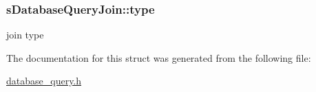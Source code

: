 \subsubsection[{\texorpdfstring{type}{type}}]{ s\+Database\+Query\+Join\+::type}\hypertarget{structsDatabaseQueryJoin_ad0a33e6334f09c044be0d360d87cf21e}{}\label{structsDatabaseQueryJoin_ad0a33e6334f09c044be0d360d87cf21e}
join type 

The documentation for this struct was generated from the following file\+:\begin{DoxyCompactItemize}
\item 
\hyperlink{database__query_8h}{database\+\_\+query.\+h}\end{DoxyCompactItemize}
